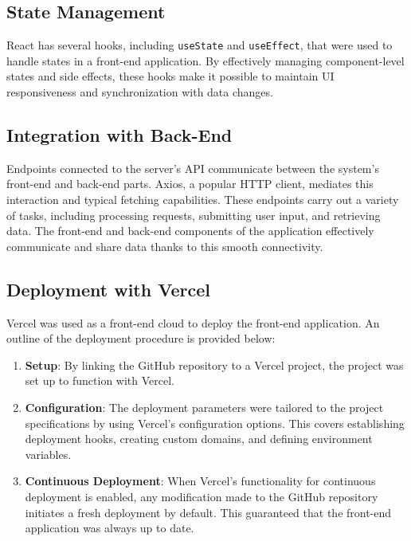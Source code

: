 \documentclass[conference]{IEEEtran}
\begin{document}
\subsection{State Management}

React has several hooks, including \texttt{useState} and \texttt{useEffect}, that were used to handle states in a front-end application. By effectively managing component-level states and side effects, these hooks make it possible to maintain UI responsiveness and synchronization with data changes.

\subsection{Integration with Back-End}

Endpoints connected to the server's API communicate between the system's front-end and back-end parts. Axios, a popular HTTP client, mediates this interaction and typical fetching capabilities. These endpoints carry out a variety of tasks, including processing requests, submitting user input, and retrieving data. The front-end and back-end components of the application effectively communicate and share data thanks to this smooth connectivity.

\subsection{Deployment with Vercel}

Vercel was used as a front-end cloud to deploy the front-end application. An outline of the deployment procedure is provided below:

\begin{enumerate}
    \item\textbf{Setup}:  By linking the GitHub repository to a Vercel project, the project was set up to function with Vercel. 
    
    \item \textbf{Configuration}: The deployment parameters were tailored to the project specifications by using Vercel's configuration options. This covers establishing deployment hooks, creating custom domains, and defining environment variables.
    
    \item \textbf{Continuous Deployment}: When Vercel's functionality for continuous deployment is enabled, any modification made to the GitHub repository initiates a fresh deployment by default. This guaranteed that the front-end application was always up to date.
\end{enumerate}
\end{document}
